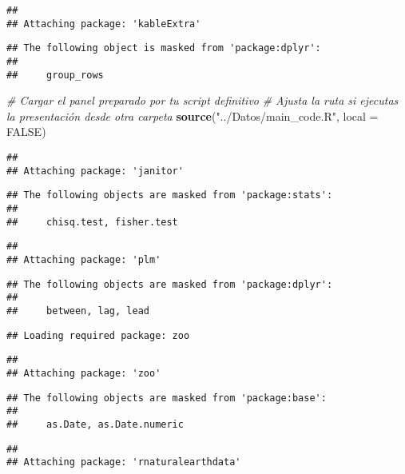 \documentclass[
  ignorenonframetext,
]{beamer}
\newenvironment{Shaded}{\begin{snugshade}}{\end{snugshade}}
\newcommand{\AttributeTok}[1]{\textcolor[rgb]{0.13,0.29,0.53}{#1}}
\newcommand{\CommentTok}[1]{\textcolor[rgb]{0.56,0.35,0.01}{\textit{#1}}}
\newcommand{\ConstantTok}[1]{\textcolor[rgb]{0.56,0.35,0.01}{#1}}
\newcommand{\FunctionTok}[1]{\textcolor[rgb]{0.13,0.29,0.53}{\textbf{#1}}}
\newcommand{\NormalTok}[1]{#1}
\newcommand{\StringTok}[1]{\textcolor[rgb]{0.31,0.60,0.02}{#1}}
\begin{document}
\begin{frame}[fragile]
\begin{verbatim}
## 
## Attaching package: 'kableExtra'
\end{verbatim}

\begin{verbatim}
## The following object is masked from 'package:dplyr':
## 
##     group_rows
\end{verbatim}

\begin{Shaded}
\begin{Highlighting}[]
\CommentTok{\# Cargar el panel preparado por tu script definitivo}
\CommentTok{\# Ajusta la ruta si ejecutas la presentación desde otra carpeta}
\FunctionTok{source}\NormalTok{(}\StringTok{"../Datos/main\_code.R"}\NormalTok{, }\AttributeTok{local =} \ConstantTok{FALSE}\NormalTok{)}
\end{Highlighting}
\end{Shaded}

\begin{verbatim}
## 
## Attaching package: 'janitor'
\end{verbatim}

\begin{verbatim}
## The following objects are masked from 'package:stats':
## 
##     chisq.test, fisher.test
\end{verbatim}

\begin{verbatim}
## 
## Attaching package: 'plm'
\end{verbatim}

\begin{verbatim}
## The following objects are masked from 'package:dplyr':
## 
##     between, lag, lead
\end{verbatim}

\begin{verbatim}
## Loading required package: zoo
\end{verbatim}

\begin{verbatim}
## 
## Attaching package: 'zoo'
\end{verbatim}

\begin{verbatim}
## The following objects are masked from 'package:base':
## 
##     as.Date, as.Date.numeric
\end{verbatim}

\begin{verbatim}
## 
## Attaching package: 'rnaturalearthdata'
\end{verbatim}


\end{frame}
\end{document}
